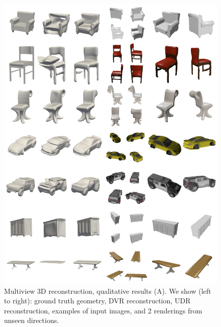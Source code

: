 \documentclass[runningheads]{llncs}
\begin{document}
\begin{figure}[t]
    \centering
    \includegraphics[width=\textwidth]{lior_1.jpg}
    \caption{Multiview 3D reconstruction, qualitative results (A). We show (left to right): ground truth geometry, DVR reconstruction, UDR reconstruction, examples of input images, and 2 renderings from unseen directions.}
    \label{fig:recon1}
\end{figure}
 
\end{document}
